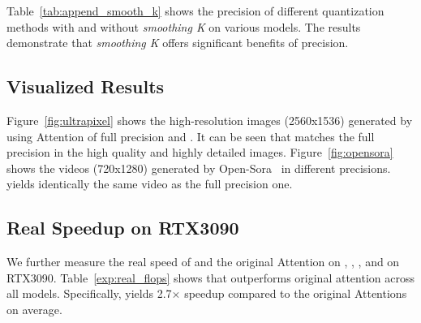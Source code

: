 Table~\ref{tab:append_smooth_k} shows the precision of different quantization methods with and without \textit{smoothing K} on various models. The results demonstrate that \textit{smoothing K} offers significant benefits of precision. 



\subsection{Visualized Results}
Figure~\ref{fig:ultrapixel} shows the high-resolution images (2560x1536) generated by \ultrapixel using Attention of full precision and \our.
It can be seen that \our matches the full precision in the high quality and highly detailed images.
Figure~\ref{fig:opensora} shows the videos (720x1280) generated by Open-Sora~\citep{opensora} in different precisions.
\our yields identically the same video as the full precision one.



\subsection{Real Speedup on RTX3090}

We further measure the real speed of \our and the original Attention on \unidiffuser, \ultrapixel, \cogvideo, \llama and \timm on RTX3090. 
Table~\ref{exp:real_flops} shows that \our outperforms original attention across all models. Specifically, \our yields 2.7$\times$ speedup compared to the original Attentions on average.







